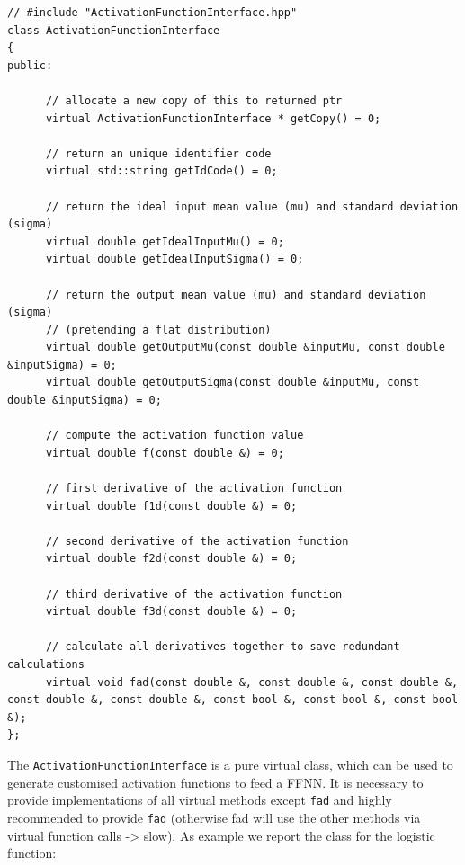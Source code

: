\documentclass[11pt,a4paper,twoside]{article}
\begin{document}
\begin{lstlisting}
// #include "ActivationFunctionInterface.hpp"
class ActivationFunctionInterface
{
public:

      // allocate a new copy of this to returned ptr
      virtual ActivationFunctionInterface * getCopy() = 0;

      // return an unique identifier code
      virtual std::string getIdCode() = 0;

      // return the ideal input mean value (mu) and standard deviation (sigma)
      virtual double getIdealInputMu() = 0;
      virtual double getIdealInputSigma() = 0;

      // return the output mean value (mu) and standard deviation (sigma)
      // (pretending a flat distribution)
      virtual double getOutputMu(const double &inputMu, const double &inputSigma) = 0;
      virtual double getOutputSigma(const double &inputMu, const double &inputSigma) = 0;

      // compute the activation function value
      virtual double f(const double &) = 0;

      // first derivative of the activation function
      virtual double f1d(const double &) = 0;

      // second derivative of the activation function
      virtual double f2d(const double &) = 0;

      // third derivative of the activation function
      virtual double f3d(const double &) = 0;

      // calculate all derivatives together to save redundant calculations
      virtual void fad(const double &, const double &, const double &, const double &, const double &, const bool &, const bool &, const bool &);
};
\end{lstlisting}

The \verb+ActivationFunctionInterface+ is a pure virtual class, which can be used to generate customised activation functions to feed a FFNN.
It is necessary to provide implementations of all virtual methods except \verb+fad+ and highly recommended to provide \verb+fad+ (otherwise fad will use the other methods via virtual function calls -> slow).
As example we report the class for the logistic function:
\end{document}
